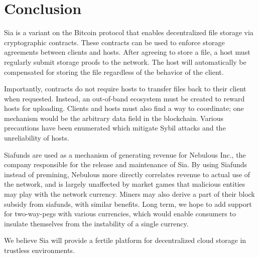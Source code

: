 \documentclass[twocolumn]{article}
\begin{document}
\section{Conclusion}
Sia is a variant on the Bitcoin protocol that enables decentralized file storage via cryptographic contracts.
These contracts can be used to enforce storage agreements between clients and hosts.
After agreeing to store a file, a host must regularly submit storage proofs to the network.
The host will automatically be compensated for storing the file regardless of the behavior of the client.

Importantly, contracts do not require hosts to transfer files back to their client when requested.
Instead, an out-of-band ecosystem must be created to reward hosts for uploading.
Clients and hosts must also find a way to coordinate; one mechanism would be the arbitrary data field in the blockchain.
Various precautions have been enumerated which mitigate Sybil attacks and the unreliability of hosts.

Siafunds are used as a mechanism of generating revenue for Nebulous Inc., the company responsible for the release and maintenance of Sia.
By using Siafunds instead of premining, Nebulous more directly correlates revenue to actual use of the network, and is largely unaffected by market games that malicious entities may play with the network currency.
Miners may also derive a part of their block subsidy from siafunds, with similar benefits.
Long term, we hope to add support for two-way-pegs with various currencies, which would enable consumers to insulate themselves from the instability of a single currency.

We believe Sia will provide a fertile platform for decentralized cloud storage in trustless environments.
\end{document}
